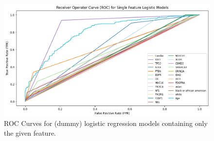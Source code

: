 \documentclass[12pt]{article}
\newtheorem{Proof of Lemma}{Proof of Lemma}
\begin{document}
\begin{figure}[h!]
  \centering
  \includegraphics[scale = 0.5]{roc-eda.png}
  \caption{ROC Curves for (dummy) logistic regression models containing only the given feature. }
  \label{fig:roc-eda}
\end{figure}
\end{document}
